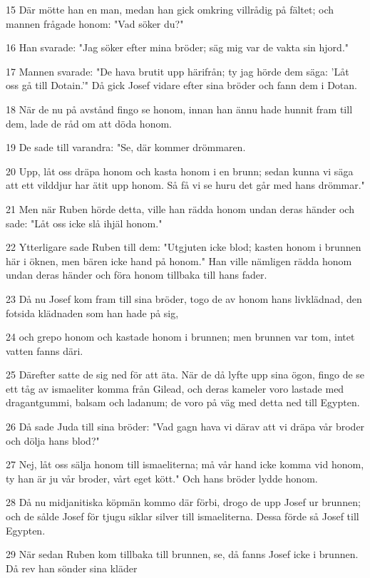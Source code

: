 \par 15 Där mötte han en man, medan han gick omkring villrådig på fältet; och mannen frågade honom: "Vad söker du?"
\par 16 Han svarade: "Jag söker efter mina bröder; säg mig var de vakta sin hjord."
\par 17 Mannen svarade: "De hava brutit upp härifrån; ty jag hörde dem säga: 'Låt oss gå till Dotain.'" Då gick Josef vidare efter sina bröder och fann dem i Dotan.
\par 18 När de nu på avstånd fingo se honom, innan han ännu hade hunnit fram till dem, lade de råd om att döda honom.
\par 19 De sade till varandra: "Se, där kommer drömmaren.
\par 20 Upp, låt oss dräpa honom och kasta honom i en brunn; sedan kunna vi säga att ett vilddjur har ätit upp honom. Så få vi se huru det går med hans drömmar."
\par 21 Men när Ruben hörde detta, ville han rädda honom undan deras händer och sade: "Låt oss icke slå ihjäl honom."
\par 22 Ytterligare sade Ruben till dem: "Utgjuten icke blod; kasten honom i brunnen här i öknen, men bären icke hand på honom." Han ville nämligen rädda honom undan deras händer och föra honom tillbaka till hans fader.
\par 23 Då nu Josef kom fram till sina bröder, togo de av honom hans livklädnad, den fotsida klädnaden som han hade på sig,
\par 24 och grepo honom och kastade honom i brunnen; men brunnen var tom, intet vatten fanns däri.
\par 25 Därefter satte de sig ned för att äta. När de då lyfte upp sina ögon, fingo de se ett tåg av ismaeliter komma från Gilead, och deras kameler voro lastade med dragantgummi, balsam och ladanum; de voro på väg med detta ned till Egypten.
\par 26 Då sade Juda till sina bröder: "Vad gagn hava vi därav att vi dräpa vår broder och dölja hans blod?"
\par 27 Nej, låt oss sälja honom till ismaeliterna; må vår hand icke komma vid honom, ty han är ju vår broder, vårt eget kött." Och hans bröder lydde honom.
\par 28 Då nu midjanitiska köpmän kommo där förbi, drogo de upp Josef ur brunnen; och de sålde Josef för tjugu siklar silver till ismaeliterna. Dessa förde så Josef till Egypten.
\par 29 När sedan Ruben kom tillbaka till brunnen, se, då fanns Josef icke i brunnen. Då rev han sönder sina kläder
